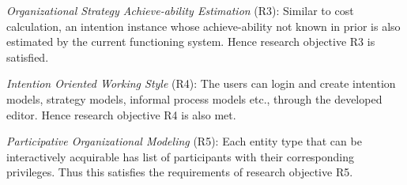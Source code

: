 \textit{Organizational Strategy Achieve-ability Estimation} (R3): Similar to cost calculation, an intention instance whose achieve-ability not known in prior is also estimated by the current functioning system. Hence research objective R3 is satisfied.

\textit{Intention Oriented Working Style} (R4): The users can login and create intention models, strategy models, informal process models etc., through the developed editor. Hence research objective R4 is also met.

\textit{Participative Organizational Modeling} (R5): Each entity type that can be interactively acquirable has list of participants with their corresponding privileges. Thus this satisfies the requirements of research objective R5.

